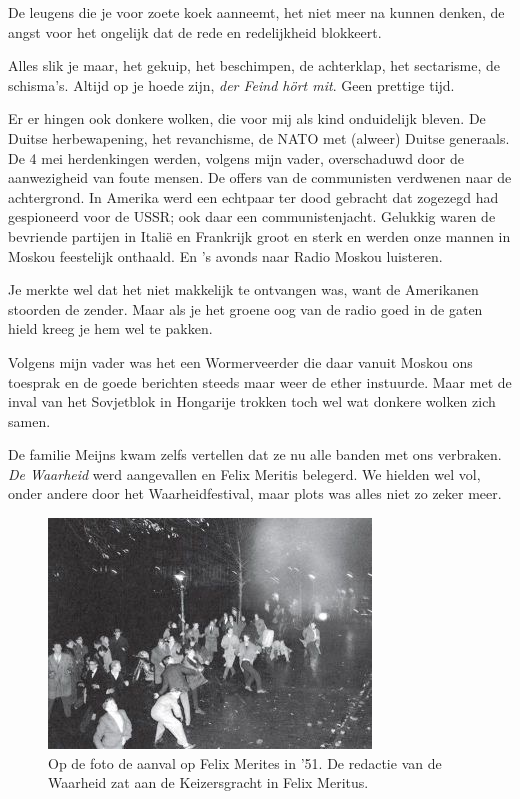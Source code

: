 \documentclass[12pt,twoside, openright]{memoir}
\begin{document}
De leugens die je voor zoete koek aanneemt, het niet meer na kunnen denken, de angst voor het ongelijk dat de rede en redelijkheid blokkeert. 

Alles slik je maar, het gekuip, het beschimpen, de achterklap, het sectarisme, de schisma's. Altijd op je hoede zijn, \emph{der Feind hört mit}. Geen prettige tijd. 

Er er hingen ook donkere wolken, die voor mij als kind onduidelijk bleven. De Duitse herbewapening, het revanchisme, de NATO met (alweer) Duitse generaals. De 4 mei herdenkingen werden, volgens mijn vader, overschaduwd door de aanwezigheid van foute mensen. De offers van de communisten verdwenen naar de achtergrond. In Amerika werd een echtpaar ter dood gebracht dat zogezegd had gespioneerd voor de USSR; ook daar een communistenjacht. Gelukkig waren de bevriende partijen in Italië en Frankrijk groot en sterk en werden onze mannen in Moskou feestelijk onthaald. En ’s avonds naar Radio Moskou luisteren. 

Je merkte wel dat het niet makkelijk te ontvangen was, want de Amerikanen stoorden de zender. Maar als je het groene oog van de radio goed in de gaten hield kreeg je hem wel te pakken. 

Volgens mijn vader was het een Wormerveerder die daar vanuit Moskou ons toesprak en de goede berichten steeds maar weer de ether instuurde. Maar met de inval van het Sovjetblok in Hongarije trokken toch wel wat donkere wolken zich samen. 

De familie Meijns kwam zelfs vertellen dat ze nu alle banden met ons verbraken. \emph{De Waarheid} werd aangevallen en Felix Meritis belegerd. We hielden wel vol, onder andere door het Waarheidfestival, maar plots was alles niet zo zeker meer.

\begin{figure}
\includegraphics[width=\textwidth]{img/ch17/Felix_Meritis1}
\caption*{\footnotesize Op de foto de aanval op Felix Merites in ’51. De redactie van de Waarheid zat aan de Keizersgracht in Felix Meritus.}
\end{figure}
\end{document}
